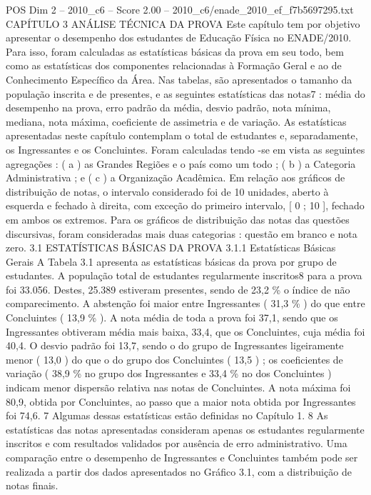 \begin{textsample}{POS Dim 2 – 2010\_c6 – Score 2.00 – 2010\_c6/enade\_2010\_ef\_f7b5697295.txt}  \label{ex:f2_pos_187}
CAPÍTULO 3 ANÁLISE TÉCNICA DA PROVA Este capítulo tem por objetivo apresentar o desempenho dos estudantes de Educação Física no ENADE/2010.
Para isso, foram calculadas as estatísticas básicas da prova em seu todo, bem como as estatísticas dos componentes relacionadas à Formação Geral e ao de Conhecimento Específico da Área.
Nas tabelas, são apresentados o tamanho da população inscrita e de presentes, e as seguintes estatísticas das notas7 : média do desempenho na prova, erro padrão da média, desvio padrão, nota mínima, mediana, nota máxima, coeficiente de assimetria e de variação.
As estatísticas apresentadas neste capítulo contemplam o total de estudantes e, separadamente, os Ingressantes e os Concluintes.
Foram calculadas tendo -se em vista as seguintes agregações : ( a ) as Grandes Regiões e o país como um todo ; ( b ) a Categoria Administrativa ; e ( c ) a Organização Acadêmica.
Em relação aos gráficos de distribuição de notas, o intervalo considerado foi de 10 unidades, aberto à esquerda e fechado à direita, com exceção do primeiro intervalo, [ 0 ; 10 ], fechado em ambos os extremos.
Para os gráficos de distribuição das notas das questões discursivas, foram consideradas mais duas categorias : questão em branco e nota zero. 3.1 ESTATÍSTICAS BÁSICAS DA PROVA 3.1.1 Estatísticas Básicas Gerais A Tabela 3.1 apresenta as estatísticas básicas da prova por grupo de estudantes.
A população total de estudantes regularmente inscritos8 para a prova foi 33.056.
Destes, 25.389 estiveram presentes, sendo de 23,2 \% o índice de não comparecimento.
A abstenção foi maior entre Ingressantes ( 31,3 \% ) do que entre Concluintes ( 13,9 \% ).
A nota média de toda a prova foi 37,1, sendo que os Ingressantes obtiveram média mais baixa, 33,4, que os Concluintes, cuja média foi 40,4.
O desvio padrão foi 13,7, sendo o do grupo de Ingressantes ligeiramente menor ( 13,0 ) do que o do grupo dos Concluintes ( 13,5 ) ; os coeficientes de variação ( 38,9 \% no grupo dos Ingressantes e 33,4 \% no dos Concluintes ) indicam menor dispersão relativa nas notas de Concluintes.
A nota máxima foi 80,9, obtida por Concluintes, ao passo que a maior nota obtida por Ingressantes foi 74,6. 7 Algumas dessas estatísticas estão definidas no Capítulo 1. 8 As estatísticas das notas apresentadas consideram apenas os estudantes regularmente inscritos e com resultados validados por ausência de erro administrativo.
Uma comparação entre o desempenho de Ingressantes e Concluintes também pode ser realizada a partir dos dados apresentados no Gráfico 3.1, com a distribuição de notas finais.

\end{textsample}
